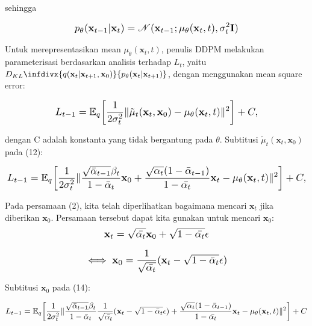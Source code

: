 \documentclass{article}
\newcommand{\infdiv}{D_{KL}\infdivx}
\newcommand*{\Scale}[2][4]{\scalebox{#1}{\ensuremath{#2}}}
\begin{document}
sehingga

\begin{equation}
\Scale[1.2]{ \displaystyle
 p_\theta(\textbf{x}_{t-1}|\textbf{x}_{t}) = \mathscr{N}(\textbf{x}_{t-1};\mu_\theta(\textbf{x}_{t},t),\sigma_t^2 \textbf{I}) }
\end{equation}

Untuk merepresentasikan mean $ \mu_\theta(\textbf{x}_{t},t) $, penulis DDPM melakukan parameterisasi berdasarkan analisis terhadap $ L_t $, yaitu $
\infdiv{ 
q(\textbf{x}_{t}|\textbf{x}_{t+1},\textbf{x}_0)
}
{
p_\theta(\textbf{x}_{t}|\textbf{x}_{t+1})
}
$, dengan menggunakan mean square error:

\begin{equation}
\Scale[1.2]{ \displaystyle
L_{t-1} = \mathbb{E}_{q} \left[ 
\frac{1}{2\sigma_t^2}
\norm{
\tilde{\mu}_t(\textbf{x}_{t},\textbf{x}_0) - \mu_\theta(\textbf{x}_{t},t)
}^2
\right] + C, }
\end{equation}

dengan C adalah konstanta yang tidak bergantung pada $ \theta $. Subtitusi $ \tilde{\mu}_t(\textbf{x}_{t},\textbf{x}_0) $ pada (12):

\begin{equation}
\Scale[1.2]{ \displaystyle
L_{t-1} = \mathbb{E}_{q} \left[ 
\frac{1}{2\sigma_t^2}
\norm{
\frac{
\sqrt{\bar{\alpha}_{t-1}}\beta_t
}
{
1 - \bar{\alpha}_t
}
\textbf{x}_0 
+
\frac{
\sqrt{\alpha_{t}}(1-\bar{\alpha}_{t-1})
}
{
1 - \bar{\alpha_t}
}
\textbf{x}_t 
-
 \mu_\theta(\textbf{x}_{t},t)
}^2
\right] + C, }
\end{equation}

Pada persamaan (2), kita telah diperlihatkan bagaimana mencari $ \textbf{x}_t $ jika diberikan $ \textbf{x}_0 $. Persamaan tersebut dapat kita gunakan untuk mencari $ \textbf{x}_0 $:
\begin{equation}
\Scale[1.2]{ \displaystyle
\textbf{x}_t = \sqrt{\bar{\alpha_t}} \textbf{x}_{0} + \sqrt{1-\bar{\alpha_t}} \epsilon}
\end{equation}

\begin{equation}
\Scale[1.2]{ \displaystyle
\iff \textbf{x}_0 = \frac{1}{\sqrt{\bar{\alpha_t}}}(\textbf{x}_{t} - \sqrt{1-\bar{\alpha}_t} \epsilon) }
\end{equation}

Subtitusi $ \textbf{x}_0 $ pada (14):

\begin{equation}
\Scale[1.2]{ \displaystyle
L_{t-1} = \mathbb{E}_{q} \left[ 
\frac{1}{2\sigma_t^2}
\norm{
\frac{
\sqrt{\bar{\alpha}_{t-1}}\beta_t
}
{
1 - \bar{\alpha}_t
}
\frac{1}{\sqrt{\bar{\alpha_t}}}(\textbf{x}_{t} - \sqrt{1-\bar{\alpha}_t} \epsilon)
+
\frac{
\sqrt{\alpha_{t}}(1-\bar{\alpha}_{t-1})
}
{
1 - \bar{\alpha_t}
}
\textbf{x}_t 
-
\mu_\theta(\textbf{x}_{t},t)
}^2
\right] + C }
\end{equation}
\end{document}
